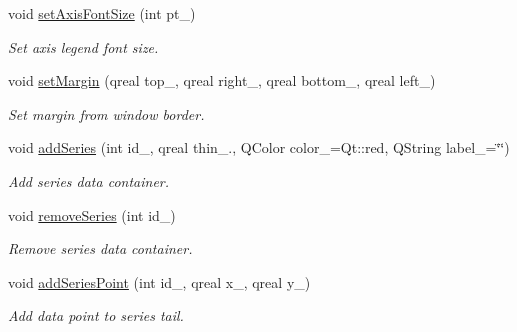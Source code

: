\begin{DoxyCompactItemize}
\mbox{\label{classeven_1_1_chart_easy_aa79ea08f979e6d96c237b7c8a745b770}} 
void \mbox{\hyperlink{classeven_1_1_chart_easy_aa79ea08f979e6d96c237b7c8a745b770}{set\+Axis\+Font\+Size}} (int pt\+\_\+)
\begin{DoxyCompactList}\small\item\em Set axis legend font size. \end{DoxyCompactList}\item 
\mbox{\label{classeven_1_1_chart_easy_a0154fa4ffcfdcd5af886c1974c41ffbd}} 
void \mbox{\hyperlink{classeven_1_1_chart_easy_a0154fa4ffcfdcd5af886c1974c41ffbd}{set\+Margin}} (qreal top\+\_\+, qreal right\+\_\+, qreal bottom\+\_\+, qreal left\+\_\+)
\begin{DoxyCompactList}\small\item\em Set margin from window border. \end{DoxyCompactList}\item 
\mbox{\label{classeven_1_1_chart_easy_affe2f1b7b05e85ed238e5197eb71dfe2}} 
void \mbox{\hyperlink{classeven_1_1_chart_easy_affe2f1b7b05e85ed238e5197eb71dfe2}{add\+Series}} (int id\+\_\+, qreal thin\+\_., Q\+Color color\+\_\+=Qt\+::red, Q\+String label\+\_\+=\char`\"{}\char`\"{})
\begin{DoxyCompactList}\small\item\em Add series data container. \end{DoxyCompactList}\item 
\mbox{\label{classeven_1_1_chart_easy_a6d8afdfacbb59faa2b351a4ba84b347d}} 
void \mbox{\hyperlink{classeven_1_1_chart_easy_a6d8afdfacbb59faa2b351a4ba84b347d}{remove\+Series}} (int id\+\_\+)
\begin{DoxyCompactList}\small\item\em Remove series data container. \end{DoxyCompactList}\item 
\mbox{\label{classeven_1_1_chart_easy_a2fef86524ecc7ce04af601864532b77b}} 
void \mbox{\hyperlink{classeven_1_1_chart_easy_a2fef86524ecc7ce04af601864532b77b}{add\+Series\+Point}} (int id\+\_\+, qreal x\+\_\+, qreal y\+\_\+)
\begin{DoxyCompactList}\small\item\em Add data point to series tail. \end{DoxyCompactList}\item 

\end{DoxyCompactItemize}
